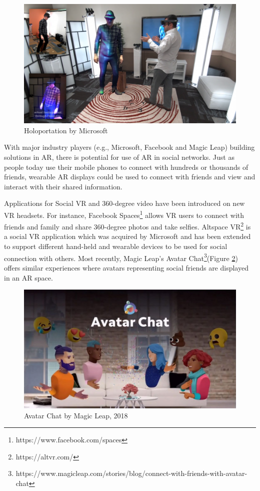 \begin{figure}[ht]
    \centering
    \includegraphics[width=0.8\linewidth]{images/10-intro/holoportation.png}
    \caption{Holoportation by Microsoft \cite{Fanello2016}}
    \label{fig:holoportation}
\end{figure}


With major industry players (e.g., Microsoft, Facebook and Magic Leap) building solutions in AR, there is potential for use of AR in social networks. Just as people today use their mobile phones to connect with hundreds or thousands of friends, wearable AR displays could be used to connect with friends and view and interact with their shared information.

Applications for Social VR and 360-degree video have been introduced on new VR headsets. For instance, Facebook Spaces\footnote{https://www.facebook.com/spaces} allows VR users to connect with friends and family and share 360-degree photos and take selfies. Altspace VR\footnote{https://altvr.com/} is a social VR application which was acquired by Microsoft and has been extended to support different hand-held and wearable devices to be used for social connection with others. Most recently, Magic Leap's Avatar Chat\footnote{https://www.magicleap.com/stories/blog/connect-with-friends-with-avatar-chat}(Figure \ref{fig:ml-avatar-chat-1}) offers similar experiences where avatars representing social friends are displayed in an AR space. 

\begin{figure}[ht]
    \centering
    \includegraphics[width=0.8\linewidth]{images/10-intro/magic-leap-avatar-chat.jpg}
    \caption{Avatar Chat by Magic Leap, 2018}
    \label{fig:ml-avatar-chat-1}
\end{figure}

